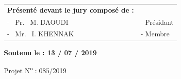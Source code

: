 \begin{titlepage}
\begin{table}[h]
\centering
\begin{tabular}{p{8cm}p{6.5cm}}
\textbf{Présenté devant le jury composé de :} \\
- \, Pr. \, M. DAOUDI & - Présidant\\
- \, Mr. \,  I. KHENNAK  & - Membre \\
\end{tabular}
\end{table}

\vspace*{0.5cm}

\textbf{Soutenu le : 13 / 07 / 2019 }

\vspace*{1.3cm}

\begin{center}
Projet N\textsuperscript{o} : 085/2019
\end{center}
\end{titlepage}
